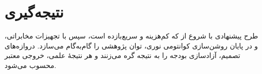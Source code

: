 \section{نتیجه‌گیری}
طرح پیشنهادی با شروع از  که کم‌هزینه و سریع‌بازده است، سپس  با تجهیزات مخابراتی، و در پایان روشن‌سازی کوانتومی نوری، توان پژوهشی را گام‌به‌گام می‌سازد. دروازه‌های تصمیم، آزادسازی بودجه را به نتیجه گره می‌زنند و هر نتیجهٔ علمی، خروجی معتبر محسوب می‌شود.

